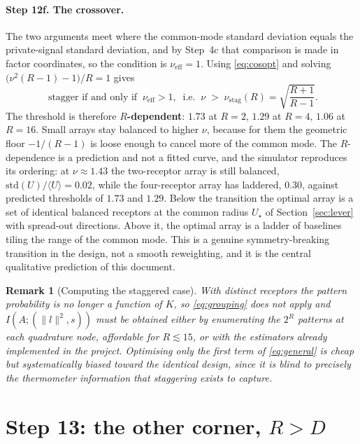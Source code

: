 \documentclass[11pt,a4paper]{article}
\newtheorem{remark}{Remark}
\newcommand{\nueff}{\nu_{\mathrm{eff}}}
\begin{document}
\paragraph{Step 12f. The crossover.} The two arguments meet where the common-mode
standard deviation equals the private-signal standard deviation, and by Step~4c that
comparison is made in factor coordinates, so the condition is $\nueff=1$. Using
\eqref{eq:cosopt} and solving $\big(\nu^2(R-1)-1\big)/R=1$ gives
\begin{equation}
  \boxed{\;\text{stagger if and only if }\ \nueff>1,
   \ \text{ i.e. }\ \nu \;>\; \nu_{\mathrm{stag}}(R)=\sqrt{\frac{R+1}{R-1}}.}
  \label{eq:nustag}
\end{equation}
The threshold is therefore \textbf{$R$-dependent}: $1.73$ at $R=2$, $1.29$ at $R=4$,
$1.06$ at $R=16$. Small arrays stay balanced to higher $\nu$, because for them the
geometric floor $-1/(R-1)$ is loose enough to cancel more of the common mode. The
$R$-dependence is a prediction and not a fitted curve, and the simulator reproduces its
ordering: at $\nu\approx1.43$ the two-receptor array is still balanced,
$\mathrm{std}(U)/\langle U\rangle=0.02$, while the four-receptor array has laddered,
$0.30$, against predicted thresholds of $1.73$ and $1.29$.
Below the transition the optimal array is a set of identical balanced receptors at the
common radius $U_\star$ of Section~\ref{sec:lever} with spread-out directions. Above it,
the optimal array is a ladder of baselines tiling the range of the common mode. This is
a genuine symmetry-breaking transition in the design, not a smooth reweighting, and it
is the central qualitative prediction of this document.

\begin{remark}[Computing the staggered case]
With distinct receptors the pattern probability is no longer a function of $K$, so
\eqref{eq:grouping} does not apply and $I(A;(\|l\|^2,s))$ must be obtained either by
enumerating the $2^R$ patterns at each quadrature node, affordable for $R\lesssim15$, or
with the estimators already implemented in the project. Optimising only the first term
of \eqref{eq:general} is cheap but systematically biased toward the identical design,
since it is blind to precisely the thermometer information that staggering exists to
capture.
\end{remark}

\section{Step 13: the other corner, $R>D$}
\label{sec:corner}
\end{document}
